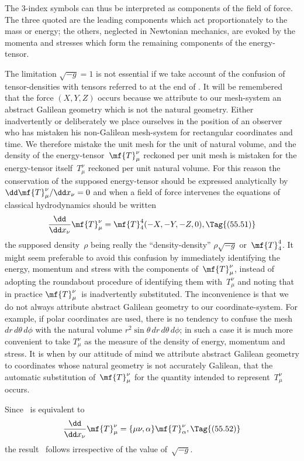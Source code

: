 \documentclass[12pt]{book}
\begin{document}
The $3$-index symbols can thus be interpreted as components of the field
of force. The three quoted are the leading components which act proportionately
to the mass or energy; the others, neglected in Newtonian mechanics,
are evoked by the momenta and stresses which form the remaining components
of the energy-tensor.

The limitation $\sqrt{-g} = 1$ is not essential if we take account of the confusion
of tensor-densities with tensors referred to at the end of . It will
be remembered that the force $(X, Y, Z)$ occurs because we attribute to our
mesh-system an abstract Galilean geometry which is not the natural geometry.
Either inadvertently or deliberately we place ourselves in the position
of an observer who has mistaken his non-Galilean mesh-system for rectangular
coordinates and time. We therefore mistake the unit mesh for the unit of
natural volume, and the density of the energy-tensor~$\mf{T}_{\mu}^{\nu}$ reckoned per unit
mesh is mistaken for the energy-tensor itself~$T_{\mu}^{\nu}$ reckoned per unit natural
volume. For this reason the conservation of the supposed energy-tensor
should be expressed analytically by $\dd\mf{T}_{\mu}^{\nu}/\dd x_{\nu} = 0$ and when a field of force
intervenes the equations of classical hydrodynamics should be written
\[
\frac{\dd}{\dd x_{\nu}} \mf{T}_{\mu}^{\nu}
= \mf{T}_{4}^{4}(-X, -Y, -Z, 0),
\Tag{(55.51)}
\]
the supposed density~$\rho$ being really the ``density-density'' $\rho\sqrt{-g}$ or~$\mf{T}_{4}^{4}$\footnotemark.\footnotetext
  {It might seem preferable to avoid this confusion by immediately identifying the energy,
  momentum and stress with the components of~$\mf{T}_{\mu}^{\nu}$, instead of adopting the roundabout procedure
  of identifying them with~$T_{\mu}^{\nu}$ and noting that in practice $\mf{T}_{\mu}^{\nu}$~is inadvertently substituted. The
  inconvenience is that we do not always attribute abstract Galilean geometry to our coordinate-system.
  For example, if polar coordinates are used, there is no tendency to confuse the mesh
  $dr\, d\theta\, d\phi$ with the natural volume $r^{2} \sin\theta\, dr\, d\theta\, d\phi$; in such a case it is much more convenient to
  take $T_{\mu}^{\nu}$ as the measure of the density of energy, momentum and stress. It is when by our
  attitude of mind we attribute abstract Galilean geometry to coordinates whose natural geometry
  is not accurately Galilean, that the automatic substitution of~$\mf{T}_{\mu}^{\nu}$ for the quantity intended to
  represent~$T_{\mu}^{\nu}$ occurs.}

Since ~is equivalent to
\[
\frac{\dd}{\dd x_{\nu}} \mf{T}_{\mu}^{\nu}
= \{\mu\nu, \alpha\} \mf{T}_{\alpha}^{\nu},
\Tag{(55.52)}
\]
the result~ follows irrespective of the value of~$\sqrt{-g}$.
\end{document}
